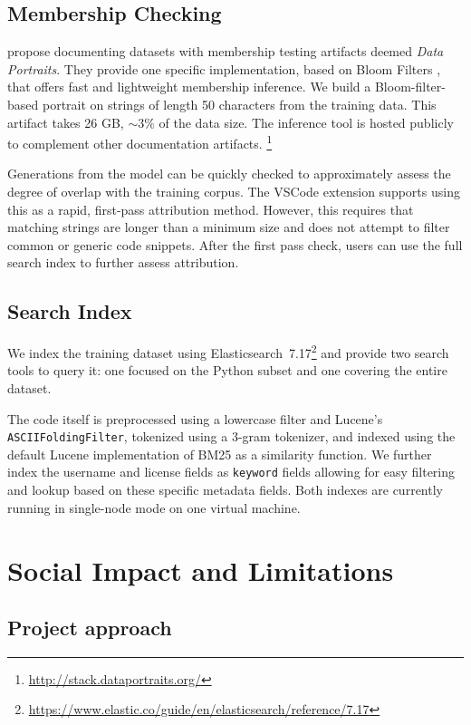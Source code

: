 \subsection{Membership Checking}
\citet{marone-data-portraits-search} propose documenting datasets with membership testing artifacts deemed \emph{Data Portraits}. They provide one specific implementation, based on Bloom Filters \citep{bloom-filters-10.1145/362686.362692}, that offers fast and lightweight membership inference. We build a Bloom-filter-based portrait on strings of length 50 characters from the training data. This artifact takes 26 GB, $\sim3\%$ of the data size. The inference tool is hosted publicly to complement other documentation artifacts. \footnote{\url{http://stack.dataportraits.org/}}

Generations from the model can be quickly checked to approximately assess the degree of overlap with the training corpus. The VSCode extension supports using this as a rapid, first-pass attribution method. However, this requires that matching strings are longer than a minimum size and does not attempt to filter common or generic code snippets. After the first pass check, users can use the full search index to further assess attribution. 

\subsection{Search Index} We index the training dataset using Elasticsearch~7.17\footnote{\url{https://www.elastic.co/guide/en/elasticsearch/reference/7.17}} and provide two search tools to query it: one focused on the Python subset and one covering the entire dataset.

The code itself is preprocessed using a lowercase filter and Lucene's \texttt{ASCIIFoldingFilter}, tokenized using a 3-gram tokenizer, and indexed using the default Lucene implementation of BM25 as a similarity function. We further index the username and license fields as \texttt{keyword} fields allowing for easy filtering and lookup based on these specific metadata fields. Both indexes are currently running in single-node mode on one virtual machine.

\section{Social Impact and Limitations}

\subsection{Project approach}

